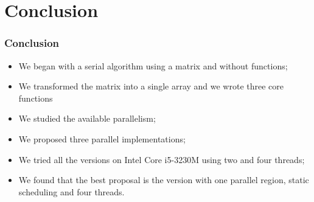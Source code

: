 \documentclass{beamer}
\begin{document}
\section{Conclusion}
\begin{frame}
	\frametitle{Conclusion}
	\begin{itemize}
		\item We began with a serial algorithm using a matrix and without functions;
		\item We transformed the matrix into a single array and we wrote three core functions
		\item We studied the available parallelism;
		\item We proposed three parallel implementations;
		\item We tried all the versions on Intel Core i5-3230M using two and four threads;
		\item We found that the best proposal is the version with one parallel region, static scheduling and four threads.
		
	\end{itemize}
	\end{frame}
\end{document}
